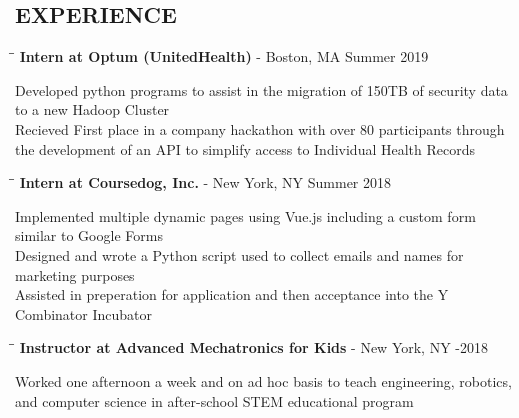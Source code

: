 \documentclass{res}
\begin{document}
\begin{resume}
\section{EXPERIENCE}
   \vspace{-0.1in}
   \begin{tabbing}
   \hspace{2.3in}\= \hspace{3.8in}\= \kill
    {\bf Intern at Optum (UnitedHealth)} - Boston, MA   \>  \>Summer 2019
   \end{tabbing}\vspace{-20pt}
    Developed python programs to assist in the migration of 150TB of security data to a new Hadoop Cluster\\
    Recieved First place in a company hackathon with over 80 participants through the development of an API to simplify access to 		Individual Health Records
    \vspace{-15pt}
   \begin{tabbing}
   \hspace{2.3in}\= \hspace{3.8in}\= \kill
    {\bf Intern at Coursedog, Inc.} - New York, NY   \>  \>Summer 2018
   \end{tabbing}\vspace{-20pt}
    Implemented multiple dynamic pages using Vue.js including a custom form similar to Google Forms\\
    Designed and wrote a Python script used to collect emails and names for marketing purposes\\
    Assisted in preperation for application and then acceptance into the Y Combinator Incubator
   \vspace{-15pt}
   \begin{tabbing}
   \hspace{2.3in}\= \hspace{4in}\= \kill
   {\bf Instructor at Advanced Mechatronics for Kids} - New York, NY   \>  -2018
   \end{tabbing}\vspace{-20pt}
    Worked one afternoon a week and on ad hoc basis to teach engineering, robotics, and computer
	science in after-school STEM educational program





\end{resume}
\end{document}
